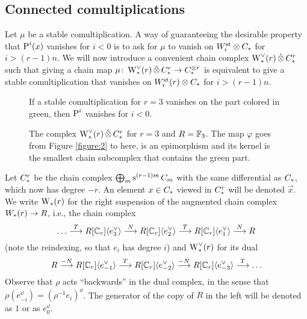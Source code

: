 \subsection{Connected comultiplications}\label{s:connected} Let $\mu$ be a stable comultiplication. A way of guaranteeing the desirable property that $\power^i(x)$ vanishes for $i<0$ is to ask for $\mu$ to vanish on $\Wst[i]\otimes \ucadenas$ for $i>(r-1)n$.
We will now introduce a convenient chain complex $\rWd(r)\hotimes \rucadenas$ such that giving a chain map $\mu\colon \rWd(r)\hotimes \rucadenas\to \ucadenas^{\otimes r}$ is equivalent to give a stable comultiplication that vanishes on $\Wst[i](r)\otimes \ucadenas$ for $i>(r-1)n$.
\begin{figure}


\caption{If a stable comultiplication for $r=3$ vanishes on the part colored in green, then $\power^i$ vanishes for $i<0$.}
\label{figure:2}


\caption{The complex $\rWd(r)\hotimes \rucadenas$ for $r=3$ and $R=\bF_3$. The map $\varphi$ goes from Figure \ref{figure:2} to here, is an epimorphism and its kernel is the smallest chain subcomplex that contains the green part.}
\label{figure:3}

\end{figure}
Let $\rucadenas$ be the chain complex $\bigoplus_m \sus{(r-1)m}\ucadenas[m]$ with the same differential as $\ucadenas$, which now has degree $-r$. An element $x\in \ucadenas$ viewed in $\rucadenas$ will be denoted $\vec{x}$. We write $\rW(r)$ for the right suspension of the augmented chain complex $\W(r)\to R$, i.e., the chain complex
\[
\ldots
\overset{T}{\lra}
R[\Cyc_r]\langle e_{3}^\dd\rangle
\overset{N}{\lra}
R[\Cyc_r]\langle e_{2}^\dd\rangle
\overset{T}{\lra}
R[\Cyc_r]\langle e_{1}^\dd\rangle
\overset{N}{\lra}
R
\]
(note the reindexing, so that $e_i$ has degree $i$) and $\rWd(r)$ for its dual
\[
R\overset{-N}{\lra} R[\Cyc_r]\langle e_{-1}^\dd\rangle \overset{T}{\lra} R[\Cyc_r]\langle e_{-2}^\dd\rangle \overset{-N}{\lra} R[\Cyc_r]\langle e_{-3}^\dd\rangle \overset{T}{\lra} \ldots
\]
Observe that $\rho$ acts ``backwards'' in the dual complex, in the sense that $\rho (e_{-i}^\dd) = (\rho^{-1} e_i)^{\dd}$. The generator of the copy of $R$ in the left will be denoted as $1$ or as $e_0^\dd$.

